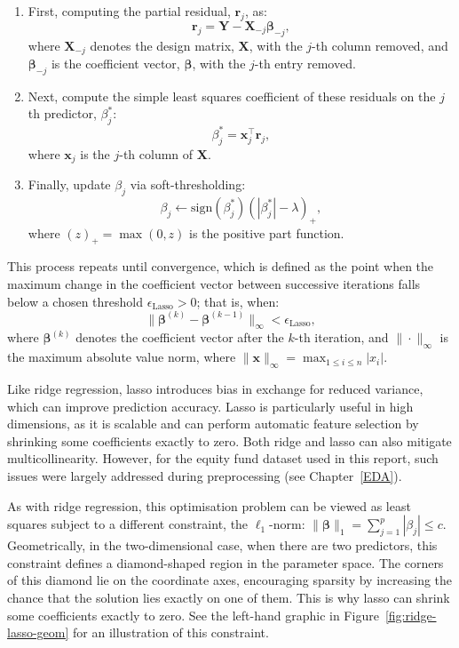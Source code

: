 \documentclass[11pt]{report} %
\begin{document}
\begin{enumerate}
    \item First, computing the partial residual, $\mathbf{r}_j$, as:
\[
\mathbf{r}_j = \mathbf{Y} - \mathbf{X}_{-j} \boldsymbol{\beta}_{-j},
\]
where \(\mathbf{X}_{-j}\) denotes the design matrix, \(\mathbf{X}\), with the \(j\)-th column removed, and \(\boldsymbol{\beta}_{-j}\) is the coefficient vector, \(\boldsymbol{\beta}\), with the \(j\)-th entry removed.
\item Next, compute the simple least squares coefficient of these residuals on the $j$th predictor, $\beta_j^*$:
\[
\beta_j^* = \mathbf{x}_j^\top \mathbf{r}_j,
\]
where $\mathbf{x}_j$ is the $j$-th column of $\mathbf{X}$.
\item Finally, update \(\beta_j\) via soft-thresholding:
\[
\beta_j \leftarrow \text{sign}(\beta_j^*) \left( |\beta_j^*| - \lambda \right)_+,
\]
where \((z)_+ = \max(0, z)\) is the positive part function.\cite{hastie2008fast}
\end{enumerate}
\noindent This process repeats until convergence, which is defined as the point when the maximum change in the coefficient vector between successive iterations falls below a chosen threshold \(\epsilon_\text{Lasso} > 0\); that is, when:
\[
\|\boldsymbol{\beta}^{(k)} - \boldsymbol{\beta}^{(k-1)}\|_{\infty} < \epsilon_\text{Lasso},
\]
where \(\boldsymbol{\beta}^{(k)}\) denotes the coefficient vector after the \(k\)-th iteration, and \(\|\cdot\|_{\infty}\) is the maximum absolute value norm, where $\|\mathbf{x}\|_{\infty} = \max_{1 \leq i \leq n} |x_i|$.

Like ridge regression, lasso introduces bias in exchange for reduced variance, which can improve prediction accuracy. Lasso is particularly useful in high dimensions, as it is scalable and can perform automatic feature selection by shrinking some coefficients exactly to zero. Both ridge and lasso can also mitigate multicollinearity. However, for the equity fund dataset used in this report, such issues were largely addressed during preprocessing (see Chapter~\ref{EDA}).

As with ridge regression, this optimisation problem can be viewed as least squares subject to a different constraint, the $\ell_1$-norm:  $\| \boldsymbol{\beta} \|_1=\sum_{j=1}^p |\beta_j| \leq c$. Geometrically, in the two-dimensional case, when there are two predictors, this constraint defines a diamond-shaped region in the parameter space. The corners of this diamond lie on the coordinate axes, encouraging sparsity by increasing the chance that the solution lies exactly on one of them. This is why lasso can shrink some coefficients exactly to zero. See the left-hand graphic in Figure~\ref{fig:ridge-lasso-geom} for an illustration of this constraint.
\end{document}
